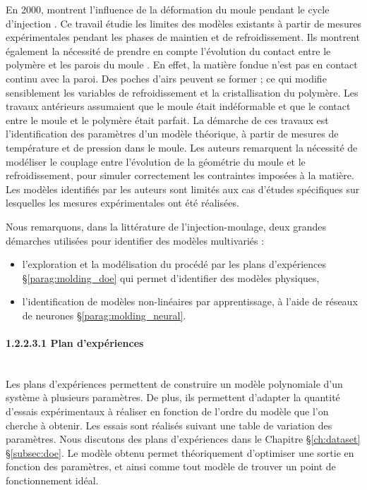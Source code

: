 En 2000, \citeauthor{delaunay_nature_2000} montrent l'influence de la déformation du moule pendant le cycle d'injection \cite{delaunay_nature_2000}.
Ce travail étudie les limites des modèles existants à partir de mesures expérimentales pendant les phases de maintien et de refroidissement.
Ils montrent également la nécessité de prendre en compte l'évolution du contact entre le polymère et les parois du moule \cite{delaunay_nature_2000a}.
En effet, la matière fondue n'est pas en contact continu avec la paroi.
Des poches d'airs peuvent se former ; ce qui modifie sensiblement les variables de refroidissement et la cristallisation du polymère.
Les travaux antérieurs assumaient que le moule était indéformable et que le contact entre le moule et le polymère était parfait.
La démarche de ces travaux est l'identification des paramètres d'un modèle théorique, à partir de mesures de température et de pression dans le moule.
Les auteurs remarquent la nécessité de modéliser le couplage entre l'évolution de la géométrie du moule et le refroidissement, pour simuler correctement les contraintes imposées à la matière.
Les modèles identifiés par les auteurs sont limités aux cas d'études spécifiques sur lesquelles les mesures expérimentales ont été réalisées.

Nous remarquons, dans la littérature de l'injection-moulage, deux grandes démarches utilisées pour identifier des modèles multivariés :
\begin{itemize}
\item l'exploration et la modélisation du procédé par les plans d'expériences §\ref{parag:molding_doe} qui permet d'identifier des modèles physiques,
\item l'identification de modèles non-linéaires par apprentissage, à l'aide de réseaux de neurones §\ref{parag:molding_neural}.
\end{itemize}

\paragraph{1.2.2.3.1 Plan d'expériences}\mbox{} \label{parag:molding_doe} \\
Les plans d’expériences permettent de construire un modèle polynomiale d’un système à plusieurs paramètres.
De plus, ils permettent d'adapter la quantité d’essais expérimentaux à réaliser en fonction de l'ordre du modèle que l'on cherche à obtenir.
Les essais sont réalisés suivant une table de variation des paramètres.
Nous discutons des plans d'expériences dans le Chapitre §\ref{ch:dataset} §\ref{subsec:doe}.
Le modèle obtenu permet théoriquement d'optimiser une sortie en fonction des paramètres, et ainsi comme tout modèle de trouver un point de fonctionnement idéal.

